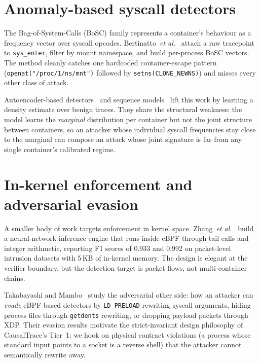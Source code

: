 \section{Anomaly-based syscall detectors}
\label{sec:lit-bosc}

The Bag-of-System-Calls (BoSC) family represents a container's behaviour as
a frequency vector over syscall opcodes. Bertinatto~\emph{et
al.}~\cite{bertinatto2024} attach a raw tracepoint to \texttt{sys\_enter},
filter by mount namespace, and build per-process BoSC vectors. The method
cleanly catches one hardcoded container-escape pattern
(\texttt{openat("/proc/1/ns/mnt")} followed by
\texttt{setns(CLONE\_NEWNS)}) and misses every other class of attack.

Autoencoder-based detectors~\cite{kotenko2024,desilva2022micro,xia2024selfsup}
and sequence models~\cite{chen2021lstm,fournier2023lm} lift this work by
learning a density estimate over benign traces. They share the structural
weakness: the model learns the \emph{marginal} distribution per container
but not the joint structure between containers, so an attacker whose
individual syscall frequencies stay close to the marginal can compose an
attack whose joint signature is far from any single container's
calibrated regime.

\section{In-kernel enforcement and adversarial evasion}
\label{sec:lit-enforcement}

A smaller body of work targets enforcement in kernel space. Zhang~\emph{et
al.}~\cite{zhang2024rtids} build a neural-network inference engine that
runs inside eBPF through tail calls and integer arithmetic, reporting F1
scores of 0.933 and 0.992 on packet-level intrusion datasets with 5\,KB of
in-kernel memory. The design is elegant at the verifier boundary, but the
detection target is packet flows, not multi-container chains.

Takabayashi and Mambo~\cite{takabayashi2024evasion} study the adversarial
other side: how an attacker can \emph{evade} eBPF-based detectors by
\texttt{LD\_PRELOAD}-rewriting syscall arguments, hiding process files
through \texttt{getdents} rewriting, or dropping payload packets through
XDP. Their evasion results motivate the strict-invariant design
philosophy of CausalTrace's Tier~1: we hook on physical contract violations
(a process whose standard input points to a socket is a reverse shell) that
the attacker cannot semantically rewrite away.

